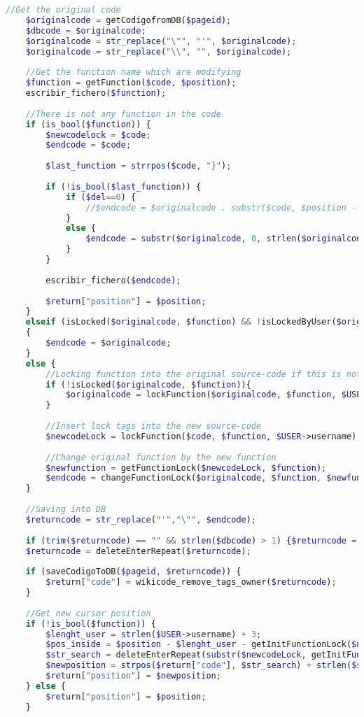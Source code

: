 \begin{lstlisting}[language=PHP]
	//Get the original code
	$originalcode = getCodigofromDB($pageid);
	$dbcode = $originalcode;
	$originalcode = str_replace("\"", "'", $originalcode);
    $originalcode = str_replace("\\", "", $originalcode);
	
	//Get the function name which are modifying
	$function = getFunction($code, $position);
	escribir_fichero($function);
	
	//There is not any function in the code
	if (is_bool($function)) {
		$newcodelock = $code;
		$endcode = $code;
		
		$last_function = strrpos($code, "}");
		
		if (!is_bool($last_function)) {
			if ($del==0) {
				//$endcode = $originalcode . substr($code, $position - 1, 1);
			}
			else {
				$endcode = substr($originalcode, 0, strlen($originalcode) - 1);
			}
		}
		
		escribir_fichero($endcode);
		
		$return["position"] = $position;
	}
	elseif (isLocked($originalcode, $function) && !isLockedByUser($originalcode, $function)) //Function is blocked by other user
	{
		$endcode = $originalcode;
	}
	else {
		//Locking function into the original source-code if this is not locked
		if (!isLocked($originalcode, $function)){
			$originalcode = lockFunction($originalcode, $function, $USER->username);
		}
	
		//Insert lock tags into the new source-code
		$newcodeLock = lockFunction($code, $function, $USER->username);
	
		//Change original function by the new function
		$newfunction = getFunctionLock($newcodeLock, $function);
		$endcode = changeFunctionLock($originalcode, $function, $newfunction);
	}
	
	//Saving into DB
	$returncode = str_replace("'","\"", $endcode);
	
	if (trim($returncode) == "" && strlen($dbcode) > 1) {$returncode = $dbcode;}
	$returncode = deleteEnterRepeat($returncode);
	
	if (saveCodigoToDB($pageid, $returncode)) {
		$return["code"] = wikicode_remove_tags_owner($returncode);
	}
	
	//Get new cursor position
	if (!is_bool($function)) {
		$lenght_user = strlen($USER->username) + 3;
		$pos_inside = $position - $lenght_user - getInitFunctionLock($newcodeLock, $function);
		$str_search = deleteEnterRepeat(substr($newcodeLock, getInitFunctionLock($newcodeLock, $function) + $lenght_user, $pos_inside + $lenght_user));
		$newposition = strpos($return["code"], $str_search) + strlen($str_search);
		$return["position"] = $newposition;
	} else {
		$return["position"] = $position;
	}
	

\end{lstlisting}
